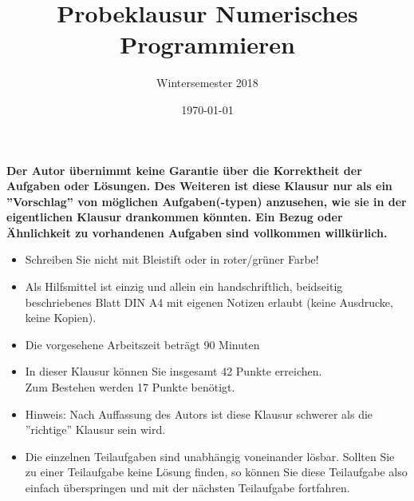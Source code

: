 \documentclass{scrartcl}
\begin{document}
\title{Probeklausur Numerisches Programmieren}
\subtitle{Wintersemester 2018}
\author{\npauthor{}}
\date{\today}
\maketitle

\textbf{Der Autor übernimmt keine Garantie über die Korrektheit der Aufgaben oder Lösungen. \n Des Weiteren ist diese Klausur nur als ein ''Vorschlag'' von möglichen Aufgaben(-typen) anzusehen, wie sie in der eigentlichen Klausur drankommen könnten. Ein Bezug oder Ähnlichkeit zu vorhandenen Aufgaben sind vollkommen willkürlich.}
\sbreak

\begin{itemize}
	\item Schreiben Sie nicht mit Bleistift oder in roter/grüner Farbe!
	\item Als Hilfsmittel ist einzig und allein ein handschriftlich, beidseitig beschriebenes Blatt DIN A4 mit eigenen Notizen erlaubt (keine Ausdrucke, keine Kopien).
	\item Die vorgesehene Arbeitszeit beträgt 90 Minuten
	\item In dieser Klausur können Sie insgesamt 42 Punkte erreichen. \\Zum Bestehen werden 17 Punkte benötigt.
	\item Hinweis: Nach Auffassung des Autors ist diese Klausur schwerer als die ''richtige'' Klausur sein wird.
	\item Die einzelnen Teilaufgaben sind unabhängig voneinander lösbar.
	Sollten Sie zu einer Teilaufgabe keine Lösung finden, so können Sie diese Teilaufgabe also einfach überspringen und mit der nächsten Teilaufgabe fortfahren.
\end{itemize}
\end{document}
